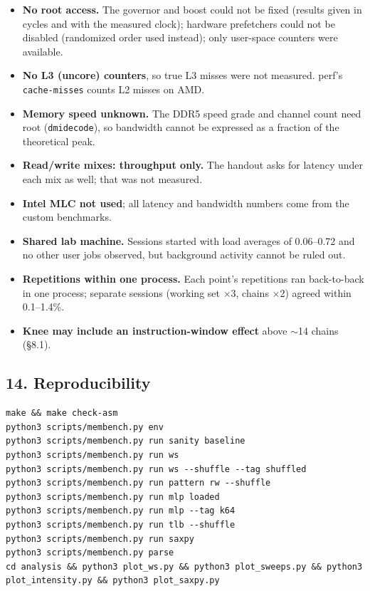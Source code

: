 \documentclass[10pt,letterpaper]{article}
\providecommand{\tightlist}{\setlength{\itemsep}{0pt}\setlength{\parskip}{0pt}}
\begin{document}
\begin{itemize}
\tightlist
\item
  \textbf{No root access.} The governor and boost could not
  be fixed (results given in cycles and with the measured
  clock); hardware prefetchers could not be disabled
  (randomized order used instead); only user-space counters
  were available.
\item
  \textbf{No L3 (uncore) counters}, so true L3 misses were
  not measured. perf's \texttt{cache-misses} counts L2
  misses on AMD.
\item
  \textbf{Memory speed unknown.} The DDR5 speed grade and
  channel count need root (\texttt{dmidecode}), so bandwidth
  cannot be expressed as a fraction of the theoretical peak.
\item
  \textbf{Read/write mixes: throughput only.} The handout
  asks for latency under each mix as well; that was not
  measured.
\item
  \textbf{Intel MLC not used}; all latency and bandwidth
  numbers come from the custom benchmarks.
\item
  \textbf{Shared lab machine.} Sessions started with load
  averages of 0.06--0.72 and no other user jobs observed,
  but background activity cannot be ruled out.
\item
  \textbf{Repetitions within one process.} Each point's
  repetitions ran back-to-back in one process; separate
  sessions (working set $\times$3, chains $\times$2) agreed within
  0.1--1.4\%.
\item
  \textbf{Knee may include an instruction-window effect}
  above $\sim$14 chains (§8.1).
\end{itemize}

\hypertarget{reproducibility}{%
\subsection{14. Reproducibility}\label{reproducibility}}

\begin{verbatim}
make && make check-asm
python3 scripts/membench.py env
python3 scripts/membench.py run sanity baseline
python3 scripts/membench.py run ws
python3 scripts/membench.py run ws --shuffle --tag shuffled
python3 scripts/membench.py run pattern rw --shuffle
python3 scripts/membench.py run mlp loaded
python3 scripts/membench.py run mlp --tag k64
python3 scripts/membench.py run tlb --shuffle
python3 scripts/membench.py run saxpy
python3 scripts/membench.py parse
cd analysis && python3 plot_ws.py && python3 plot_sweeps.py && python3 plot_intensity.py && python3 plot_saxpy.py
\end{verbatim}
\end{document}
